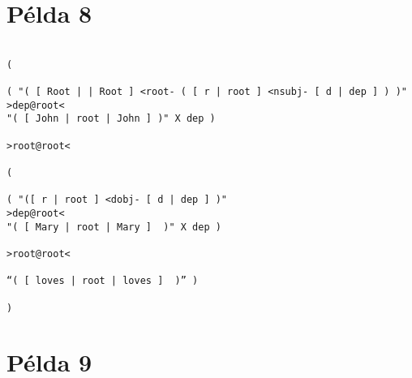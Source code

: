 \section{Példa 8}
\label{sec:example8}

\begin{verbatim}

( 

( "( [ Root | | Root ] <root- ( [ r | root ] <nsubj- [ d | dep ] ) )" 
>dep@root< 
"( [ John | root | John ] )" X dep ) 

>root@root<

( 

( "([ r | root ] <dobj- [ d | dep ] )" 
>dep@root< 
"( [ Mary | root | Mary ]  )" X	dep ) 

>root@root<

“( [ loves | root | loves ]  )” )

)
\end{verbatim}



\section{Példa 9}
\label{sec:example9}

